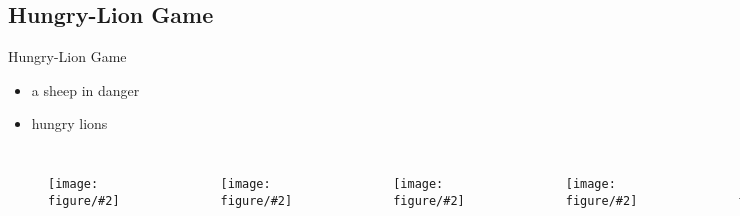 \documentclass{beamer}
\newcommand{\fig}[2]
{
  \begin{figure}[htp]
	  \centering
	  \texttt{[image: figure/\#2]}
  \end{figure}
}
\begin{document}
\subsection{Hungry-Lion Game}

\begin{frame}{Hungry-Lion Game}
  \begin{problem}
    \begin{itemize}
      \item a sheep in danger
      \item hungry lions
    \end{itemize}
    \begin{columns}
        \fig{width = 0.90\textwidth}{sheep}
        \fig{width = 0.90\textwidth}{lionking}
        \fig{width = 0.90\textwidth}{lion}
        \fig{width = 0.90\textwidth}{lion}
        \fig{width = 0.90\textwidth}{lion}  
        \fig{width = 0.90\textwidth}{lion}
    \end{columns}
  \end{problem}
\end{frame}
\end{document}

